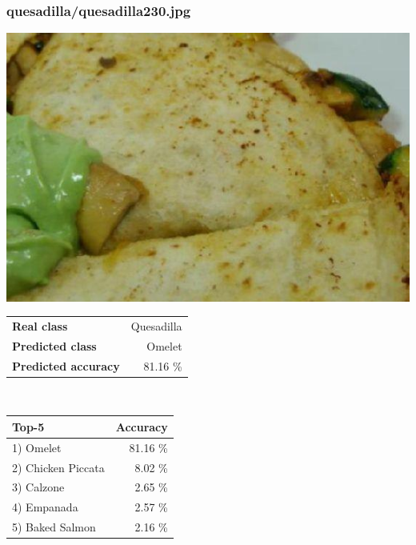 \subsubsection{quesadilla/quesadilla230.jpg}

\begin{minipage}[t]{0.4\textwidth}
	\vspace{0pt}
	\includegraphics[width=\linewidth]{images/evaluation-images/quesadilla/quesadilla230.jpg}
\end{minipage}
\hfill
\begin{minipage}[t]{0.5\textwidth}
	\vspace{0pt}\raggedright
	\begin{tabularx}{\textwidth}{X r}
		\small \textbf{Real class} & \small Quesadilla\\
		\small \textbf{Predicted class} & \small Omelet\\
		\small \textbf{Predicted accuracy} & \small 81.16 \%
    \end{tabularx}\\
    
    \vspace{6pt}
	\begin{tabularx}{\textwidth}{X r}
        \small \textbf{Top-5} & \small \textbf{Accuracy} \\
        \hline
		\small 1) Omelet & \small 81.16 \%\\\small 2) Chicken Piccata & \small 8.02 \%\\\small 3) Calzone & \small 2.65 \%\\\small 4) Empanada & \small 2.57 \%\\\small 5) Baked Salmon & \small 2.16 \%
    \end{tabularx}
\end{minipage}
    

